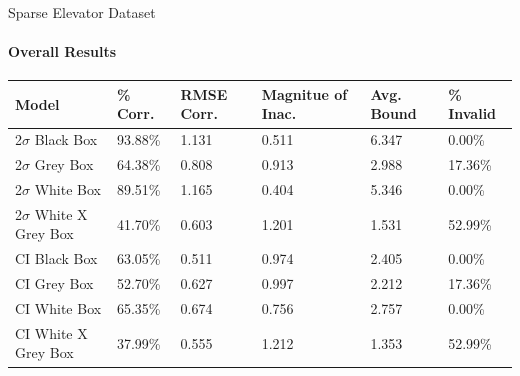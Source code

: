 \documentclass{beamer}
\begin{document}
\begin{frame}[t]{Sparse Elevator Dataset}
  \framesubtitle{Overall Results}

  \vspace*{-0.5cm}
  \begin{table}[htp!]
  \small
  \begin{tabular}{|p{2.5cm}|p{1.3cm}|p{1.0cm}|p{1.7cm}|p{1.0cm}|p{1.5cm}|}

    \hline
    \textbf{Model} &
    \textbf{\% Corr.} &
    \textbf{RMSE Corr.} &
    \textbf{Magnitue of Inac.} &
    \textbf{Avg. Bound} &
    \textbf{\% Invalid} \\
    \hline

    2$\sigma$ Black Box &
    93.88\% &
    1.131 &
    0.511 &
    6.347 &
    0.00\% \\
    \hline

    2$\sigma$ Grey Box &
    64.38\% &
    0.808 &
    0.913 &
    2.988 &
    17.36\% \\
    \hline

    2$\sigma$ White Box &
    89.51\% &
    1.165 &
    0.404 &
    5.346 &
    0.00\% \\
    \hline

    2$\sigma$ White X Grey Box &
    41.70\% &
    0.603 &
    1.201 &
    1.531 &
    52.99\% \\
    \hline

    CI Black Box &
    63.05\% &
    0.511 &
    0.974 &
    2.405 &
    0.00\% \\
    \hline

    CI Grey Box &
    52.70\% &
    0.627 &
    0.997 &
    2.212 &
    17.36\% \\
    \hline

    CI White Box &
    65.35\% &
    0.674 &
    0.756 &
    2.757 &
    0.00\% \\
    \hline

    CI White X Grey Box &
    37.99\% &
    0.555 &
    1.212 &
    1.353 &
    52.99\% \\
    \hline


\end{tabular}
\end{table}

\end{frame}
\end{document}
